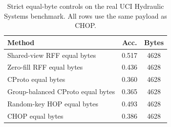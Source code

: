 \begin{table}[t]
\centering
\caption{Strict equal-byte controls on the real UCI Hydraulic Systems benchmark. All rows use the same payload as CHOP.}
\label{tab:strict-equal-byte-hydraulic}
\begin{tabular}{lcc}
\toprule
Method & Acc. & Bytes \\
\midrule
Shared-view RFF equal bytes & 0.517 & 4628 \\
Zero-fill RFF equal bytes & 0.436 & 4628 \\
CProto equal bytes & 0.360 & 4628 \\
Group-balanced CProto equal bytes & 0.365 & 4628 \\
Random-key HOP equal bytes & 0.493 & 4628 \\
CHOP equal bytes & 0.386 & 4628 \\
\bottomrule
\end{tabular}
\end{table}
